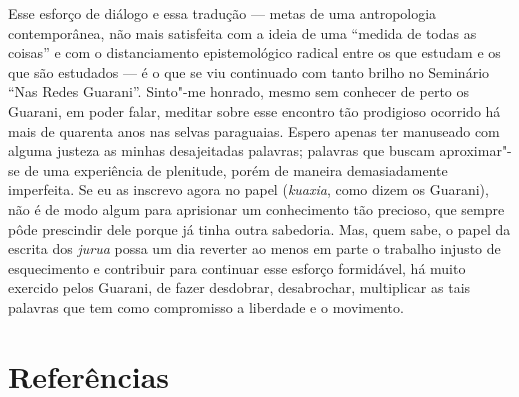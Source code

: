 Esse esforço de diálogo e essa tradução --- metas de uma antropologia
contemporânea, não mais satisfeita com a ideia de uma ``medida de todas
as coisas'' e com o distanciamento epistemológico radical entre os que
estudam e os que são estudados --- é o que se viu continuado com tanto
brilho no Seminário ``Nas Redes Guarani''. Sinto"-me honrado, mesmo sem
conhecer de perto os Guarani, em poder falar, meditar sobre esse
encontro tão prodigioso ocorrido há mais de quarenta anos nas selvas
paraguaias. Espero apenas ter manuseado com alguma justeza as minhas
desajeitadas palavras; palavras que buscam aproximar"-se de uma
experiência de plenitude, porém de maneira demasiadamente imperfeita.
Se eu as inscrevo agora no papel (\emph{kuaxia}, como dizem os Guarani), não é
de modo algum para aprisionar um conhecimento tão precioso, que sempre
pôde prescindir dele porque já tinha outra sabedoria. Mas, quem sabe, o
papel da escrita dos \emph{jurua} possa um dia reverter ao menos em parte o
trabalho injusto de esquecimento e contribuir para continuar esse
esforço formidável, há muito exercido pelos Guarani, de fazer
desdobrar, desabrochar, multiplicar as tais palavras que tem como
compromisso a liberdade e o movimento.

\section{Referências}

